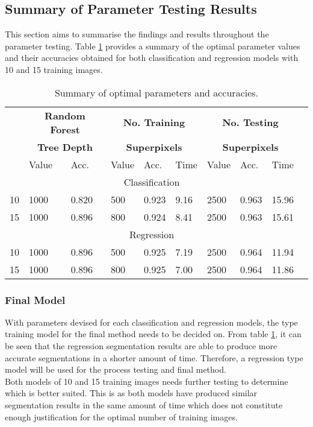 \subsection{Summary of Parameter Testing Results}
This section aims to summarise the findings and results throughout the parameter testing. Table \ref{table:paramres} provides a summary of the optimal parameter values and their accuracies obtained for both classification and regression models with 10 and 15 training images.

\begin{table}[H]
\centering
\caption{Summary of optimal parameters and accuracies. }

\begin{tabular}{|l|l|l|l|l|l|l|l|l|l|}
\hline
	& \multicolumn{2}{|c|}{\textbf{Random Forest}} & \multicolumn{3}{|c|}{\textbf{No. Training}} & \multicolumn{3}{|c|}{\textbf{No. Testing}}	\\
	&\multicolumn{2}{|c|}{\textbf{Tree Depth}}& 	\multicolumn{3}{|c|}{\textbf{Superpixels}} & \multicolumn{3}{|c|}{\textbf{Superpixels}}\\
\hline
  & Value & Acc. & Value & Acc. & Time & Value & Acc. & Time \\	
\hline 
\hline
\multicolumn{9}{|c|}{Classification}\\
\hline
10 & 1000 & 0.820 & 500 & 0.923 & 9.16 & 2500 & 0.963 & 15.96\\
15 & 1000 & 0.896 & 800 & 0.924 & 8.41 & 2500 & 0.963 & 15.61 \\
\hline
\hline
\multicolumn{9}{|c|}{Regression}\\
\hline
10 & 1000 & 0.896 & 500 & 0.925 & 7.19 & 2500 & 0.964 & 11.94\\
15 & 1000 & 0.896 & 800 & 0.925 & 7.00 & 2500 & 0.964 & 11.86\\
\hline
		   		
\end{tabular}
\label{table:paramres}
\end{table}

\subsubsection{Final Model}
With parameters devised for each classification and regression models, the type training model for the final method needs to be decided on.  From table \ref{table:paramres}, it can be seen that the regression segmentation results are able to produce more accurate segmentations in a shorter amount of time. Therefore, a regression type model will be used for the process testing and final method. 
\\[1\baselineskip]
Both models of 10 and 15 training images needs further testing to determine which is better suited. This is as both models have produced similar segmentation results in the same amount of time which does not constitute enough justification for the optimal number of training images. 

